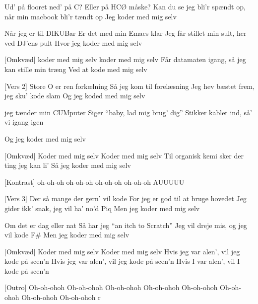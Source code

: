 \documentclass{article}
\begin{document}
\begin{song}
[Vers 1]
%
Ud’ på flooret ned’ på C?
Eller på HCØ måske?
Kan du se jeg bli’r spændt op, når min 
macbook bli’r tændt op
Jeg koder med mig selv

Når jeg er til DIKUBar
Er det med min Emacs klar
Jeg får stillet min sult, her ved DJ’ens pult
Hvor jeg koder med mig selv 

[Omkvæd]
koder med mig selv 
koder med mig selv 
Får datamaten igang, så jeg kan stille min træng 
Ved at kode med mig selv 

[Vers 2]
Store O er ren forkælning
Så jeg kom til forelæsning
Jeg hev bæstet frem, jeg sku’ kode slam
Og jeg koded med mig selv

jeg tænder min CUMputer
Siger “baby, lad mig brug’ dig”
Stikker kablet ind, så’ vi igang igen

Og jeg koder med mig selv  

[Omkvæd]
Koder med mig selv  
Koder med mig selv  
Til organisk kemi sker der ting jeg kan li’  
Så jeg koder med mig selv  

[Kontrast]
oh-oh-oh
oh-oh-oh
oh-oh-oh
oh-oh-oh AUUUUU


[Vers 3]
Der så mange der gern’ vil kode
For jeg er god til at bruge hovedet
Jeg gider ikk’ snak, jeg vil ha’ no’d Piq
Men jeg koder med mig selv

Om det er dag eller nat
Så har jeg “an itch to Scratch”
Jeg vil dreje mis, og jeg vil kode F\# 
Men jeg koder med mig selv 

[Omkvæd]
Koder med mig selv 
Koder med mig selv 
Hvis jeg var alen’, vil jeg kode på scen’n
Hvis jeg var alen’, vil jeg kode på scen’n
Hvis I var alen’, vil I kode på scen’n

[Outro]
Oh-oh-ohoh
Oh-oh-ohoh
Oh-oh-ohoh
Oh-oh-ohoh
Oh-oh-ohoh 
Oh-oh-ohoh 
Oh-oh-ohoh 
Oh-oh-ohoh r

\end{song}

\end{document}
